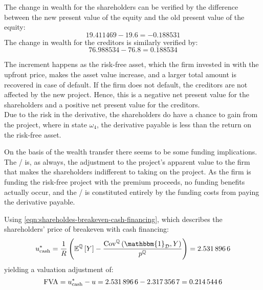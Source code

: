 \documentclass[main.tex]{subfiles}
\begin{document}
            The change in wealth for the shareholders can be verified by the difference between the new present value of the equity and the old present value of the equity:
            \begin{equation*}
                \num{19.411469} - \num{19.6} = \num{-0.188531}
            \end{equation*}
            The change in wealth for the creditors is similarly verified by:
            \begin{equation*}
                \num{76.988534} - \num{76.8} = \num{0.188534}
            \end{equation*}
            
            The increment happens as the risk-free asset, which the firm invested in with the upfront price, 
            makes the asset value increase, and a larger total amount is recovered in case of default. 
            If the firm does not default, the creditors are not affected by the new project.
            Hence, this is a negative net present value for the shareholders 
            and a positive net present value for the creditors.
            \\
            Due to the risk in the derivative, the shareholders do have a chance to gain from the project, 
            where in state $\omega_4$, the derivative payable is less than the return on the risk-free asset.

            On the basis of the wealth transfer there seems to be some funding implications.
            The \FVA/ is, as always, the adjustment to the project's apparent value to the firm that makes the shareholders indifferent to taking on the project.
            As the firm is funding the risk-free project with the premium proceeds, no funding benefits actually occur, and the \FVA/ is constituted entirely by the funding costs from paying the derivative payable.

            Using \cref{eqn:shareholdes-breakeven-cash-financing}, which describes the shareholders' price of breakeven with cash financing:
            \begin{equation*}
                u_{\text{cash}}^{\ast} = \discountfactor \left(
                    \mathbb{E}^{\rnmeasure}\left[Y\right] -
                    \frac{\text{Cov}^{\rnmeasure}\left(\mathbbm{1}_{\mathcal{D}},Y\right)}
                    {p^{\rnmeasure}}
                \right)
                = \num{2.5318966}
            \end{equation*}
            yielding a valuation adjustment of:
            \begin{equation*}
                \FVA/ = u_{\text{cash}}^{\ast} - u = \num{2.5318966} - \num{2.3173567} = \num{0.2145446}
            \end{equation*}
\end{document}
